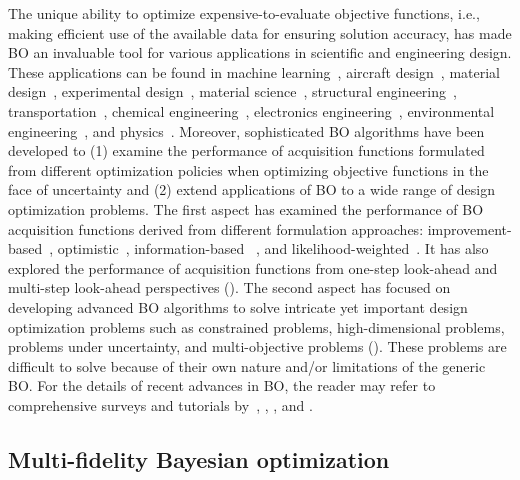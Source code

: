 \documentclass[journal ]{new-aiaa}
\begin{document}
	The unique ability to optimize expensive-to-evaluate objective functions, i.e., making efficient use of the available data for ensuring solution accuracy, has made BO an invaluable tool for various applications in scientific and engineering design.
	These applications can be found in machine learning~\citep{Bergstra2011}, aircraft design~\citep{Priem2020}, material design~\citep{Tran2019,Khatamsaz2021md}, experimental design~\citep{Greenhill2020}, material science~\citep{Ueno2016}, structural engineering~\citep{Mathern2021}, transportation~\citep{ShiR2021}, chemical engineering~\citep{Park2018}, electronics engineering~\citep{Torun2018}, environmental engineering~\citep{Manheim2019}, and  physics~\citep{Roussel2021}.
	Moreover, sophisticated BO algorithms have been developed to
	(1) examine the performance of acquisition functions formulated from different optimization policies
	when optimizing objective functions in the face of uncertainty and
	(2) extend applications of BO to a wide range of design optimization problems.
	The first aspect has examined the performance of BO acquisition functions derived from different formulation approaches: improvement-based~\citep{Jones2001}, optimistic~\citep{Srinivas2010}, information-based ~\citep{Hennig2012}, and likelihood-weighted~\citep{Blanchard2021jcp}.
	It has also explored the performance of acquisition functions from one-step look-ahead and multi-step look-ahead perspectives ().
	The second aspect has focused on developing advanced BO algorithms to solve intricate yet important design optimization problems such as constrained problems, high-dimensional problems, problems under uncertainty, and multi-objective problems ().
	These problems are difficult to solve because of their own nature and/or limitations of the generic BO.
	For the details of recent advances in BO, the reader may refer to comprehensive surveys and tutorials by~\citet{Brochu2010}, \citet{Shahriari2016}, \citet{Frazier2018}, and \citet{Wang2023}.
	
	\subsection{Multi-fidelity Bayesian optimization}\label{Sec33}
	
\end{document}
